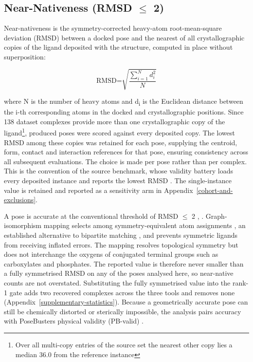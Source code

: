 \hypertarget{near-nativeness-rmsd-2uxe5}{%
\subsection{\texorpdfstring{Near-Nativeness (RMSD \ensuremath{\leq} 2\angstrom{})}{Near-Nativeness (RMSD <= 2 Angstrom)}}\label{near-nativeness-rmsd-2uxe5}}

Near-nativeness is the symmetry-corrected heavy-atom root-mean-square deviation (RMSD) between a docked pose and the nearest of all crystallographic copies of the ligand deposited with the structure, computed in place without superposition:

\[\text{RMSD=}\sqrt{\frac{\sum_{i = 1}^{N}d_{i}^{\text{2}}}{N}}\]

where N is the number of heavy atoms and d\textsubscript{i} is the Euclidean distance between the i-th corresponding atoms in the docked and crystallographic positions. 
Since 138 dataset complexes provide more than one crystallographic copy of the ligand\footnote{Over all multi-copy entries of the source set the nearest other copy lies a median 36.0\angstrom{} from the reference instance}, produced poses were scored against every deposited copy. The lowest RMSD among these copies was retained for each pose, supplying the centroid, form, contact and interaction references for that pose, ensuring consistency across all subsequent evaluations. The choice is made per pose rather than per complex. This is the convention of the source benchmark, whose validity battery loads every deposited instance and reports the lowest RMSD \cite{ref035}. The single-instance value is retained and reported as a sensitivity arm in Appendix~\ref{cohort-and-exclusions}. 

A pose is accurate at the conventional threshold of RMSD \ensuremath{\leq} 2\angstrom{} \cite{ref022}, \cite{ref050}. Graph-isomorphism mapping selects among symmetry-equivalent atom assignments \cite{ref044}, an established alternative to bipartite matching \cite{ref048}, and prevents symmetric ligands from receiving inflated errors. The mapping resolves topological symmetry but does not interchange the oxygens of conjugated terminal groups such as carboxylates and phosphates. The reported value is therefore never smaller than a fully symmetrised RMSD on any of the poses analysed here, so near-native counts are not overstated. Substituting the fully symmetrised value into the rank-1 gate adds two recovered complexes across the three tools and removes none (Appendix~\ref{supplementary-statistics}). Because a geometrically accurate pose can still be chemically distorted or sterically impossible, the analysis pairs accuracy with PoseBusters physical validity (PB-valid) \cite{ref035}.


